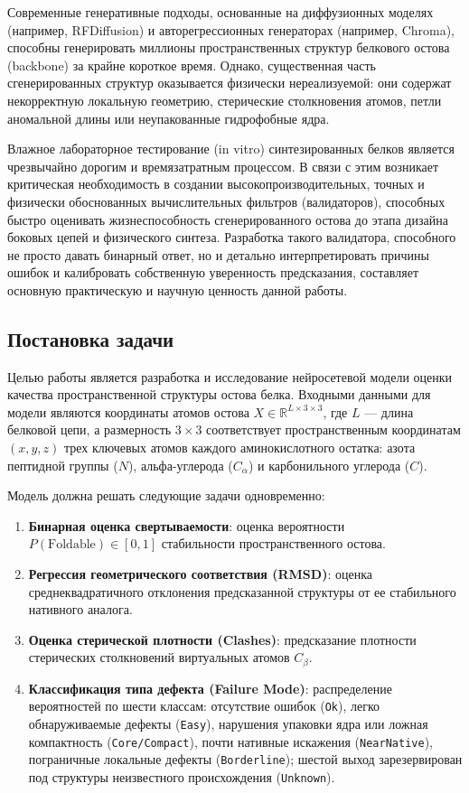 \documentclass[12pt, a4paper]{article}
\begin{document}
Современные генеративные подходы, основанные на диффузионных моделях (например, RFDiffusion) и авторегрессионных генераторах (например, Chroma), способны генерировать миллионы пространственных структур белкового остова (backbone) за крайне короткое время. Однако, существенная часть сгенерированных структур оказывается физически нереализуемой: они содержат некорректную локальную геометрию, стерические столкновения атомов, петли аномальной длины или неупакованные гидрофобные ядра. 

Влажное лабораторное тестирование (in vitro) синтезированных белков является чрезвычайно дорогим и времязатратным процессом. В связи с этим возникает критическая необходимость в создании высокопроизводительных, точных и физически обоснованных вычислительных фильтров (валидаторов), способных быстро оценивать жизнеспособность сгенерированного остова до этапа дизайна боковых цепей и физического синтеза. Разработка такого валидатора, способного не просто давать бинарный ответ, но и детально интерпретировать причины ошибок и калибровать собственную уверенность предсказания, составляет основную практическую и научную ценность данной работы.

\subsection{Постановка задачи}
Целью работы является разработка и исследование нейросетевой модели оценки качества пространственной структуры остова белка. 
Входными данными для модели являются координаты атомов остова $X \in \mathbb{R}^{L \times 3 \times 3}$, где $L$ — длина белковой цепи, а размерность $3 \times 3$ соответствует пространственным координатам $(x, y, z)$ трех ключевых атомов каждого аминокислотного остатка: азота пептидной группы ($N$), альфа-углерода ($C_\alpha$) и карбонильного углерода ($C$).

Модель должна решать следующие задачи одновременно:
\begin{enumerate}
    \item \textbf{Бинарная оценка свертываемости}: оценка вероятности $P(\mathrm{Foldable}) \in [0, 1]$ стабильности пространственного остова.
    \item \textbf{Регрессия геометрического соответствия (RMSD)}: оценка среднеквадратичного отклонения предсказанной структуры от ее стабильного нативного аналога.
    \item \textbf{Оценка стерической плотности (Clashes)}: предсказание плотности стерических столкновений виртуальных атомов $C_\beta$.
    \item \textbf{Классификация типа дефекта (Failure Mode)}: распределение вероятностей по шести классам: отсутствие ошибок (\texttt{Ok}), легко обнаруживаемые дефекты (\texttt{Easy}), нарушения упаковки ядра или ложная компактность (\texttt{Core/Compact}), почти нативные искажения (\texttt{NearNative}), пограничные локальные дефекты (\texttt{Borderline}); шестой выход зарезервирован под структуры неизвестного происхождения (\texttt{Unknown}).
\end{enumerate}
\end{document}
